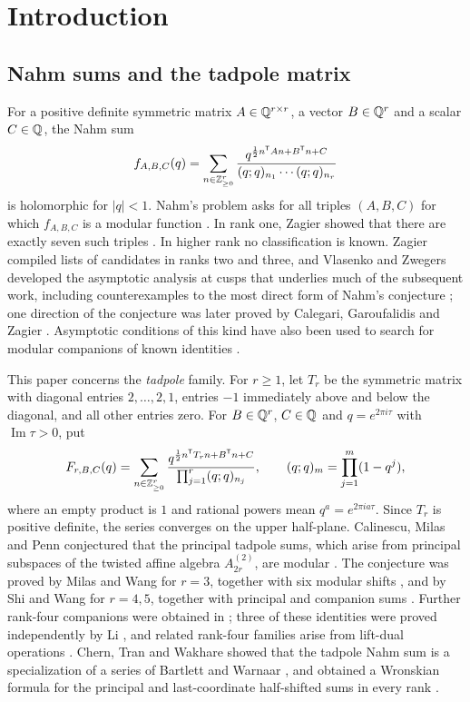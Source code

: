 \section{Introduction}\label{sec:intro}

\subsection{Nahm sums and the tadpole matrix}
For a positive definite symmetric matrix $A\in\mathbb{Q}^{r\times r}$, a vector $B\in\mathbb{Q}^r$ and a scalar $C\in\mathbb{Q}$, the Nahm sum
\[
f_{A,B,C}(q)=\sum_{n\in\mathbb{Z}_{\ge0}^r}\frac{q^{\frac12 n^{\mathsf{T}} An+B^{\mathsf{T}} n+C}}{(q;q)_{n_1}\cdots(q;q)_{n_r}}
\]
is holomorphic for $|q|<1$. Nahm's problem asks for all triples $(A,B,C)$ for which $f_{A,B,C}$ is a modular function \cite{Nahm07,Zagier07}. In rank one, Zagier showed that there are exactly seven such triples \cite{Zagier07}. In higher rank no classification is known. Zagier compiled lists of candidates in ranks two and three, and Vlasenko and Zwegers developed the asymptotic analysis at cusps that underlies much of the subsequent work, including counterexamples to the most direct form of Nahm's conjecture \cite{VZ11}; one direction of the conjecture was later proved by Calegari, Garoufalidis and Zagier \cite{CGZ}. Asymptotic conditions of this kind have also been used to search for modular companions of known identities \cite{Kanade19}.

This paper concerns the \emph{tadpole} family. For $r\ge1$, let $T_r$ be the symmetric matrix with diagonal entries $2,\dots,2,1$, entries $-1$ immediately above and below the diagonal, and all other entries zero. For $B\in\mathbb{Q}^r$, $C\in\mathbb{Q}$ and $q=e^{2\pi i\tau}$ with $\operatorname{Im}\tau>0$, put
\begin{equation}\label{eq:nahm}
F_{r,B,C}(q)=\sum_{n\in\mathbb{Z}_{\ge0}^r}\frac{q^{\frac12 n^{\mathsf{T}} T_rn+B^{\mathsf{T}} n+C}}{\prod_{j=1}^r(q;q)_{n_j}},\qquad (q;q)_m=\prod_{j=1}^m(1-q^j),
\end{equation}
where an empty product is $1$ and rational powers mean $q^a=e^{2\pi ia\tau}$. Since $T_r$ is positive definite, the series converges on the upper half-plane. Calinescu, Milas and Penn conjectured that the principal tadpole sums, which arise from principal subspaces of the twisted affine algebra $A_{2r}^{(2)}$, are modular \cite{CMP16}. The conjecture was proved by Milas and Wang for $r=3$, together with six modular shifts \cite{MW24}, and by Shi and Wang for $r=4,5$, together with principal and companion sums \cite{SW26}. Further rank-four companions were obtained in \cite{SW26b}; three of these identities were proved independently by Li \cite{Li26}, and related rank-four families arise from lift-dual operations \cite{CW25,CW26}. Chern, Tran and Wakhare showed that the tadpole Nahm sum is a specialization of a series of Bartlett and Warnaar \cite{BW15}, and obtained a Wronskian formula for the principal and last-coordinate half-shifted sums in every rank \cite{CTW26}.

